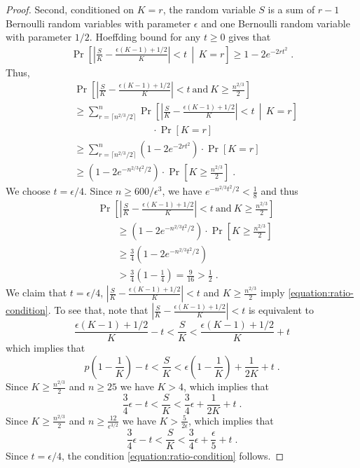 \begin{proof}
Second, conditioned on $K=r$, the random variable $S$
is a sum of $r-1$ Bernoulli random variables with parameter $\epsilon$
and one Bernoulli random variable with parameter $1/2$. Hoeffding bound for any $t \ge 0$
gives that
\begin{align*}
\Pr \left[ \left| \frac{S}{K} - \frac{\epsilon(K - 1) + 1/2}{K} \right| < t \, \middle| \, K = r \right] \ge 1 - 2 e^{-2 r t^2} \; .
\end{align*}
Thus,
\begin{align*}
& \Pr \left[ \left| \frac{S}{K} - \frac{\epsilon(K - 1) + 1/2}{K} \right| < t \ \text{and} \ K \ge \frac{n^{2/3}}{2} \right] \\
& \ge \sum_{r = \lceil n^{2/3} / 2 \rceil}^n \Pr \left[ \left| \frac{S}{K} - \frac{\epsilon(K - 1) + 1/2}{K} \right| < t  \, \middle| \,  K = r \right] \\
& \qquad \qquad \qquad \qquad \cdot \Pr[K = r] \\
& \ge \sum_{r = \lceil n^{2/3} / 2 \rceil}^n \left( 1 - 2 e^{-2 r t^2} \right) \cdot \Pr[K = r] \\
& \ge \left( 1 - 2 e^{-n^{2/3}  t^2 / 2} \right) \cdot \Pr \left[ K \ge \frac{n^{2/3}}{2} \right] \; .
\end{align*}
We choose $t = \epsilon/4$. Since $n \ge 600/\epsilon^3$, we have $e^{-n^{2/3}  t^2 / 2} < \frac{1}{8}$ and thus
\begin{align*}
& \Pr \left[ \left| \frac{S}{K} - \frac{\epsilon(K - 1) + 1/2}{K} \right| < t \ \text{and} \ K \ge \frac{n^{2/3}}{2} \right] \\
& \qquad \ge \left( 1 - 2 e^{-n^{2/3}  t^2 / 2} \right) \cdot \Pr \left[ K \ge \frac{n^{2/3}}{2} \right] \\
& \qquad \ge \frac{3}{4} \left( 1 - 2 e^{-n^{2/3}  t^2 / 2} \right) \\
& \qquad > \frac{3}{4} \left( 1 - \frac{1}{4} \right) = \frac{9}{16} > \frac{1}{2} \; .
\end{align*}
We claim that $t = \epsilon/4$,
$\left| \frac{S}{K} - \frac{\epsilon(K - 1) + 1/2}{K} \right| < t$
and $K \ge \frac{n^{2/3}}{2}$ imply \eqref{equation:ratio-condition}.
To see that, note that $\left| \frac{S}{K} - \frac{\epsilon(K - 1) + 1/2}{K} \right| < t$ is equivalent to
$$
\frac{\epsilon(K - 1) + 1/2}{K} - t < \frac{S}{K} < \frac{\epsilon(K - 1) + 1/2}{K} + t
$$
which implies that
$$
p \left(1 - \frac{1}{K} \right) - t < \frac{S}{K} < \epsilon \left(1 - \frac{1}{K} \right) + \frac{1}{2K} + t \; .
$$
Since $K \ge \frac{n^{2/3}}{2}$ and $n \ge 25$ we have $K > 4$, which implies that
$$
\frac{3}{4} \epsilon - t < \frac{S}{K} < \frac{3}{4} \epsilon + \frac{1}{2K} + t \; .
$$
Since $K \ge \frac{n^{2/3}}{2}$ and $n \ge \frac{12}{\epsilon^{3/2}}$ we have $K > \frac{5}{2\epsilon}$, which implies that
$$
\frac{3}{4} \epsilon - t < \frac{S}{K} < \frac{3}{4} \epsilon + \frac{\epsilon}{5} + t \; .
$$
Since $t = \epsilon/4$, the condition \eqref{equation:ratio-condition} follows.
\end{proof}
